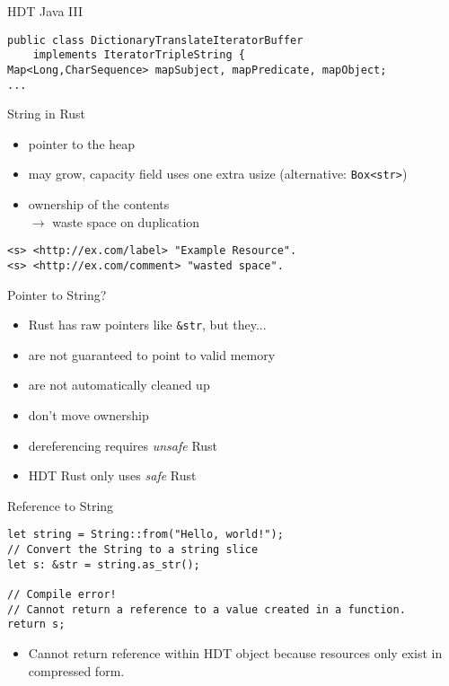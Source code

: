 \documentclass[14pt,aspectratio=169]{beamer}
\newcommand\con{\item[$-$]}
\begin{document}
\begin{frame}[fragile]{HDT Java III}
\small
\begin{verbatim}
public class DictionaryTranslateIteratorBuffer
    implements IteratorTripleString {
Map<Long,CharSequence> mapSubject, mapPredicate, mapObject;
...
\end{verbatim}
\end{frame}

\begin{frame}[fragile]{String in Rust}
\begin{itemize}
\item pointer to the heap
\con may grow, capacity field uses one extra usize (alternative: \texttt{Box<str>})
\con ownership of the contents\\$\rightarrow$ waste space on duplication
\end{itemize}
\begin{verbatim}
<s> <http://ex.com/label> "Example Resource".
<s> <http://ex.com/comment> "wasted space".
\end{verbatim}
\end{frame}

\begin{frame}{Pointer to String?}
\begin{itemize}
\item Rust has raw pointers like \texttt{\&str}, but they...
\con are not guaranteed to point to valid memory
\con are not automatically cleaned up
\con don't move ownership
\con dereferencing requires \emph{unsafe} Rust
\item HDT Rust only uses \emph{safe} Rust
\end{itemize}
\end{frame}

\begin{frame}[fragile]{Reference to String}
\small
\begin{verbatim}
let string = String::from("Hello, world!");
// Convert the String to a string slice
let s: &str = string.as_str();

// Compile error!
// Cannot return a reference to a value created in a function.
return s;
\end{verbatim}
\begin{itemize}
\item Cannot return reference within HDT object because resources only exist in compressed form.
\end{itemize}
\end{frame}
\end{document}
